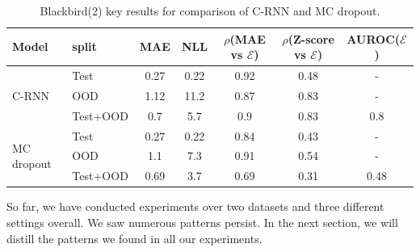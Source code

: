 \begin{table}[h]
\centering
    \begin{tabular}{l l c c c c c}  
        \toprule
        Model & split & MAE & NLL & $\rho$(MAE vs $\mathcal{E}$) &
        $\rho$(Z-score vs $\mathcal{E}$) & AUROC($\mathcal{E}$)\\
        \midrule
        \multirow{3}{*}{C-RNN} 
            & Test     & 0.27 & 0.22 & 0.92 & 0.48 & - \\  
            & OOD      & 1.12 & 11.2 & 0.87 & 0.83 & -\\  
            & Test+OOD & 0.7  & 5.7  & 0.9  & 0.83 & 0.8\\ 

        \midrule
        \multirow{3}{*}{MC dropout} 
            & Test     & 0.27 & 0.22 & 0.84  & 0.43 & - \\  
            & OOD      & 1.1 & 7.3   & 0.91  & 0.54 & -\\  
            & Test+OOD & 0.69 & 3.7  & 0.69  & 0.31 & 0.48\\ 

        \toprule
    \end{tabular}
    \caption{Blackbird(2) key results for comparison of C-RNN and MC dropout.}
    \label{tbl:bb2_comparison}
\end{table}

So far, we have conducted experiments over two datasets and three different settings overall. We saw numerous patterns persist. In the next section, we will distill the patterns we found in all our experiments.

